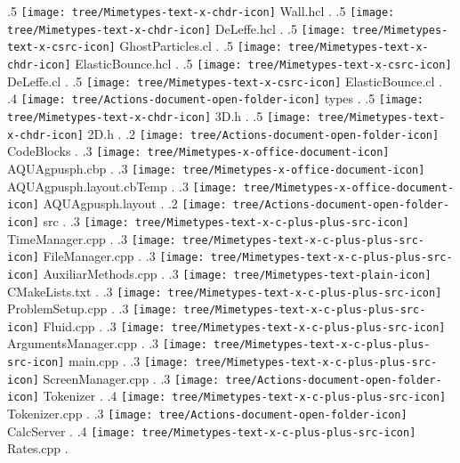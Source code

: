 {.5 { \texttt{[image: tree/Mimetypes-text-x-chdr-icon]} Wall.hcl }.
.5 { \texttt{[image: tree/Mimetypes-text-x-chdr-icon]} DeLeffe.hcl }.
.5 { \texttt{[image: tree/Mimetypes-text-x-csrc-icon]} GhostParticles.cl }.
.5 { \texttt{[image: tree/Mimetypes-text-x-chdr-icon]} ElasticBounce.hcl }.
.5 { \texttt{[image: tree/Mimetypes-text-x-csrc-icon]} DeLeffe.cl }.
.5 { \texttt{[image: tree/Mimetypes-text-x-csrc-icon]} ElasticBounce.cl }.
.4 { \texttt{[image: tree/Actions-document-open-folder-icon]} types }.
.5 { \texttt{[image: tree/Mimetypes-text-x-chdr-icon]} 3D.h }.
.5 { \texttt{[image: tree/Mimetypes-text-x-chdr-icon]} 2D.h }.
.2 { \texttt{[image: tree/Actions-document-open-folder-icon]} CodeBlocks }.
.3 { \texttt{[image: tree/Mimetypes-x-office-document-icon]} AQUAgpusph.cbp }.
.3 { \texttt{[image: tree/Mimetypes-x-office-document-icon]} AQUAgpusph.layout.cbTemp }.
.3 { \texttt{[image: tree/Mimetypes-x-office-document-icon]} AQUAgpusph.layout }.
.2 { \texttt{[image: tree/Actions-document-open-folder-icon]} src }.
.3 { \texttt{[image: tree/Mimetypes-text-x-c-plus-plus-src-icon]} TimeManager.cpp }.
.3 { \texttt{[image: tree/Mimetypes-text-x-c-plus-plus-src-icon]} FileManager.cpp }.
.3 { \texttt{[image: tree/Mimetypes-text-x-c-plus-plus-src-icon]} AuxiliarMethods.cpp }.
.3 { \texttt{[image: tree/Mimetypes-text-plain-icon]} CMakeLists.txt }.
.3 { \texttt{[image: tree/Mimetypes-text-x-c-plus-plus-src-icon]} ProblemSetup.cpp }.
.3 { \texttt{[image: tree/Mimetypes-text-x-c-plus-plus-src-icon]} Fluid.cpp }.
.3 { \texttt{[image: tree/Mimetypes-text-x-c-plus-plus-src-icon]} ArgumentsManager.cpp }.
.3 { \texttt{[image: tree/Mimetypes-text-x-c-plus-plus-src-icon]} main.cpp }.
.3 { \texttt{[image: tree/Mimetypes-text-x-c-plus-plus-src-icon]} ScreenManager.cpp }.
.3 { \texttt{[image: tree/Actions-document-open-folder-icon]} Tokenizer }.
.4 { \texttt{[image: tree/Mimetypes-text-x-c-plus-plus-src-icon]} Tokenizer.cpp }.
.3 { \texttt{[image: tree/Actions-document-open-folder-icon]} CalcServer }.
.4 { \texttt{[image: tree/Mimetypes-text-x-c-plus-plus-src-icon]} Rates.cpp }.
}
